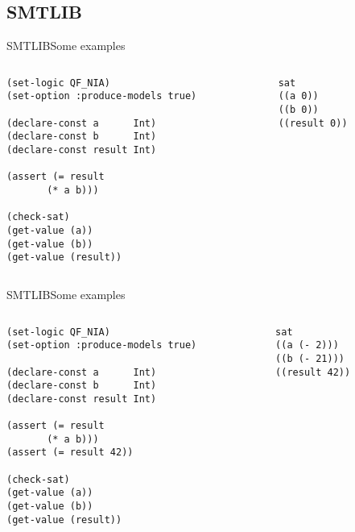 \documentclass[aspectratio=169]{beamer}
\begin{document}
\subsection{SMTLIB}

\begin{frame}[fragile]{SMTLIB}{Some examples}
  \begin{columns}
    \begin{column}{0.5\textwidth}
      \begin{lstlisting}[language=SMTLIB]
(set-logic QF_NIA)
(set-option :produce-models true)

(declare-const a      Int)
(declare-const b      Int)
(declare-const result Int)

(assert (= result
	   (* a b)))

(check-sat)
(get-value (a))
(get-value (b))
(get-value (result))
\end{lstlisting}
\end{column}
    \pause
    \begin{column}{0.5\textwidth}
      \begin{scriptsize}
\begin{verbatim}
sat
((a 0))
((b 0))
((result 0))
\end{verbatim}
      \end{scriptsize}
    \end{column}
  \end{columns}
\end{frame}

\begin{frame}[fragile]{SMTLIB}{Some examples}
  \begin{columns}
    \begin{column}{0.5\textwidth}
      \begin{lstlisting}[language=SMTLIB]
(set-logic QF_NIA)
(set-option :produce-models true)

(declare-const a      Int)
(declare-const b      Int)
(declare-const result Int)

(assert (= result
	   (* a b)))
(assert (= result 42))

(check-sat)
(get-value (a))
(get-value (b))
(get-value (result))
\end{lstlisting}
\end{column}
    \pause
    \begin{column}{0.5\textwidth}
      \begin{scriptsize}
\begin{verbatim}
sat
((a (- 2)))
((b (- 21)))
((result 42))
\end{verbatim}
      \end{scriptsize}
    \end{column}
  \end{columns}
\end{frame}
\end{document}
